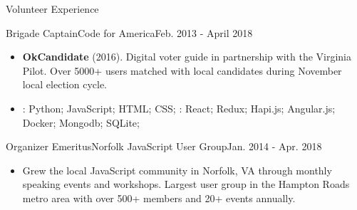 \documentclass[]{mcdowellcv}
\begin{document}
    \begin{cvsection}{Volunteer Experience}
        \begin{cvsubsection}{Brigade Captain}{Code for America}{Feb. 2013 - April 2018}
            \begin{itemize}
                \item \textbf{OkCandidate} (2016). Digital voter guide in partnership with the Virginia Pilot. Over 5000+ users matched with local candidates during November local election cycle.
            \end{itemize}
            \begin{itemize}
                 \item {}:  Python; JavaScript; HTML; CSS; \newline
                : React; Redux; Hapi.js; Angular.js; Docker; Mongodb; SQLite;
            \end{itemize}

        \end{cvsubsection}

        \begin{cvsubsection}{Organizer Emeritus}{Norfolk JavaScript User Group}{Jan. 2014 - Apr. 2018}
            \begin{itemize}
                \item Grew the local JavaScript community in Norfolk, VA through monthly speaking events and workshops. Largest user group in the Hampton Roads metro area with over 500+ members and 20+ events annually.
            \end{itemize}
        \end{cvsubsection}
    \end{cvsection}
\end{document}
